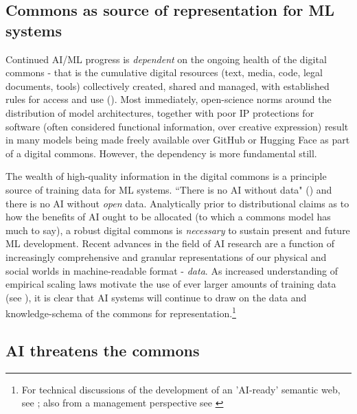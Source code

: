 \subsection*{Commons as source of representation for ML systems}

Continued AI/ML progress is \textit{dependent} on the ongoing health of the digital commons - that is the cumulative digital resources (text, media, code, legal documents, tools) collectively created, shared and managed, with established rules for access and use (\cite{meadwayCREATINGDIGITALCOMMONS}). Most immediately, open-science norms around the distribution of model architectures, together with poor IP protections for software (often considered functional information, over creative expression) result in many models being made freely available over GitHub or Hugging Face as part of a digital commons. However, the dependency is more fundamental still.

The wealth of high-quality information in the digital commons is a principle source of training data for ML systems. ``There is no AI without data" (\cite{groger2021ThereNoAI, 2023WhatWeMean}) and there is no AI without \textit{open} data. Analytically prior to distributional claims as to how the benefits of AI ought to be allocated (to which a commons model has much to say), a robust digital commons is \textit{necessary} to sustain present and future ML development. Recent advances in the field of AI research are a function of increasingly comprehensive and granular representations of our physical and social worlds in machine-readable format - \textit{data}. As increased understanding of empirical scaling laws motivate the use of ever larger amounts of training data (see \textcite{hoffmann2022EmpiricalAnalysisComputeoptimal, kaplan2020ScalingLawsNeural, villalobos2022WillWeRunb}), it is clear that AI systems will continue to draw on the data and knowledge-schema of the commons for representation.\footnote{For technical discussions of the development of an 'AI-ready' semantic web, see \textcite{LinkedDataDesign, WTFKnowledgeGraph}; also from a management perspective see \textcite{criado2019CreatingPublicValue}}

\subsection*{AI threatens the commons}

